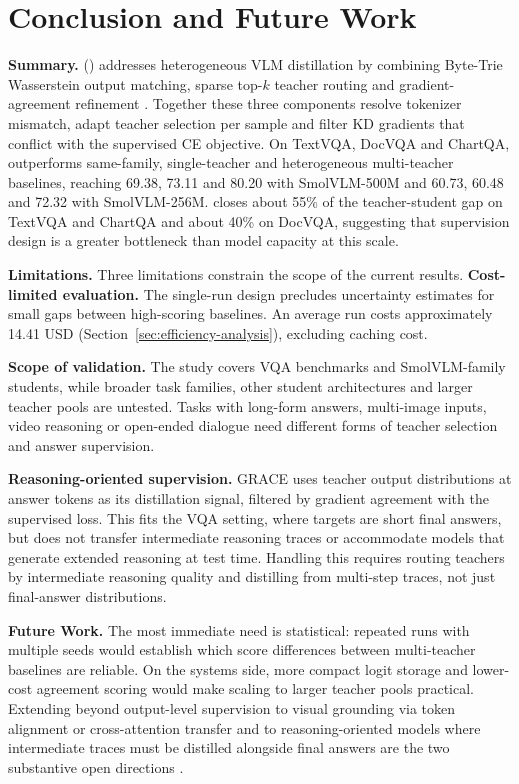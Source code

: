 \chapter*{Conclusion and Future Work}
{}

\textbf{Summary.} \gracefull{} (\gracename{}) addresses heterogeneous VLM
distillation by combining Byte-Trie Wasserstein output matching, sparse
top-\(k\) teacher routing and gradient-agreement refinement
\cite{boizard2024towardscrosstokenizerdistillation,peyre2019computationaloptimaltransport,fedus2022switchtransformersscalingtrillion}.
Together these three components resolve tokenizer mismatch, adapt teacher
selection per sample and filter KD gradients that conflict with the
supervised CE objective. On TextVQA, DocVQA and ChartQA, \methodname{}
outperforms same-family, single-teacher and heterogeneous multi-teacher
baselines, reaching 69.38, 73.11 and 80.20 with SmolVLM-500M and 60.73,
60.48 and 72.32 with SmolVLM-256M. \methodname{} closes about 55\% of the
teacher-student gap on TextVQA and ChartQA and about 40\% on DocVQA,
suggesting that supervision design is a greater bottleneck than model
capacity at this scale.

\textbf{Limitations.} Three limitations constrain the scope of the current results. \textbf{Cost-limited evaluation.} The single-run design precludes uncertainty estimates for small gaps between
high-scoring baselines. An average run costs approximately 14.41 USD
(Section~\ref{sec:efficiency-analysis}), excluding caching cost. 

\textbf{Scope of validation.} The study covers VQA benchmarks and
SmolVLM-family students, while broader task families, other student architectures
and larger teacher pools are untested. Tasks with long-form answers,
multi-image inputs, video reasoning or open-ended dialogue need different
forms of teacher selection and answer supervision.

\textbf{Reasoning-oriented supervision.}
GRACE uses teacher output distributions at answer tokens as its distillation
signal, filtered by gradient agreement with the supervised loss. This fits the VQA setting, where targets are short final answers, but does not
transfer intermediate reasoning traces or accommodate models that generate
extended reasoning at test time. Handling this requires routing teachers by intermediate reasoning quality
and distilling from multi-step traces, not just final-answer distributions.

\textbf{Future Work.} The most immediate need is statistical: repeated runs
with multiple seeds would establish which score differences between
multi-teacher baselines are reliable. On the systems side, more compact
logit storage and lower-cost agreement scoring would make scaling to larger
teacher pools practical. Extending \methodname{} beyond output-level
supervision to visual grounding via token alignment or cross-attention
transfer and to reasoning-oriented models where intermediate traces must be
distilled alongside final answers are the two substantive open directions
\cite{yuan2020reinforcedmultiteacherselection,zhang2023adaptivemultiteachermetalearning,yu2024selectdistill}.
